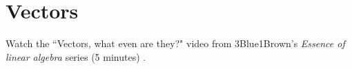 \section{Vectors}

Watch the ``Vectors, what even are they?" video from 3Blue1Brown's
\textit{Essence of linear algebra} series (5 minutes) \cite{bib:linalg_vectors}.
